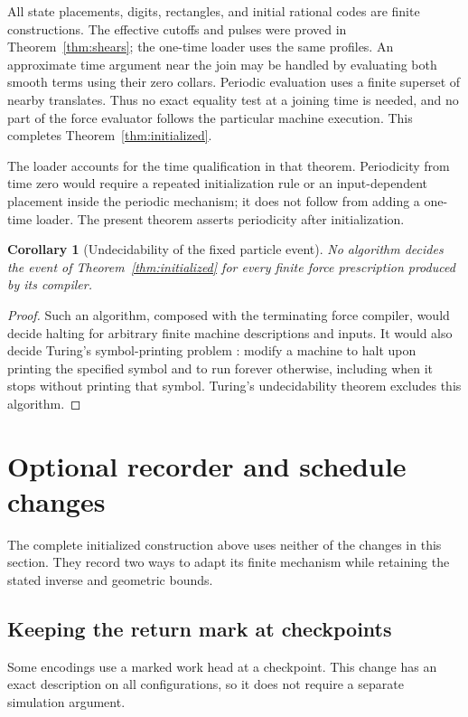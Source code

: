 \documentclass[11pt]{article}
\newtheorem{corollary}[theorem]{Corollary}
\theoremstyle{remark}
\begin{document}
All state placements, digits, rectangles, and initial rational codes are
finite constructions. The effective cutoffs and pulses were proved in
Theorem~\ref{thm:shears}; the one-time loader uses the same profiles.
An approximate time argument near the join may be handled by evaluating
both smooth terms using their zero collars. Periodic evaluation uses a
finite superset of nearby translates. Thus no exact equality test at a
joining time is needed, and no part of the force evaluator follows the
particular machine execution. This completes
Theorem~\ref{thm:initialized}.

The loader accounts for the time qualification in that theorem. Periodicity
from time zero would require a repeated initialization rule or an
input-dependent placement inside the periodic mechanism; it does not follow
from adding a one-time loader. The present theorem asserts periodicity after initialization.

\begin{corollary}[Undecidability of the fixed particle event]
No algorithm decides the event of Theorem~\ref{thm:initialized} for every
finite force prescription produced by its compiler.
\end{corollary}
\begin{proof}
Such an algorithm, composed with the terminating force compiler, would
decide halting for arbitrary finite machine descriptions and inputs. It would
also decide Turing's symbol-printing problem \cite[Section~8]{Turing}: modify
a machine to halt upon printing the specified symbol and to run forever
otherwise, including when it stops without printing that symbol. Turing's
undecidability theorem excludes this algorithm.
\end{proof}

\section{Optional recorder and schedule changes}\label{sec:optional}
The complete initialized construction above uses neither of the changes
in this section. They record two ways to adapt its finite mechanism while
retaining the stated inverse and geometric bounds.

\subsection{Keeping the return mark at checkpoints}
Some encodings use a marked work head at a checkpoint. This change has an
exact description on all configurations, so it does not require a separate
simulation argument.
\end{document}
